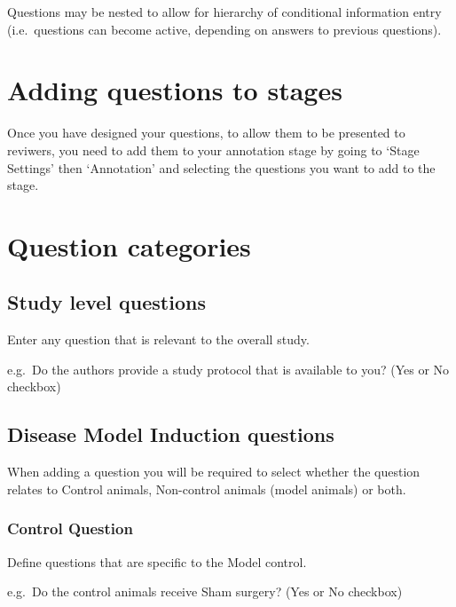 \documentclass[
]{book}
\begin{document}
Questions may be nested to allow for hierarchy of conditional information entry (i.e.~questions can become active, depending on answers to previous questions).

\hypertarget{adding-questions-to-stages}{%
\section{Adding questions to stages}\label{adding-questions-to-stages}}

Once you have designed your questions, to allow them to be presented to reviwers, you need to add them to your annotation stage by going to `Stage Settings' then `Annotation' and selecting the questions you want to add to the stage.

\hypertarget{question-categories-1}{%
\section{Question categories}\label{question-categories-1}}

\hypertarget{study-level-questions}{%
\subsection{Study level questions}\label{study-level-questions}}

Enter any question that is relevant to the overall study.

e.g.~Do the authors provide a study protocol that is available to you?
(Yes or No checkbox)

\hypertarget{disease-model-induction-questions}{%
\subsection{Disease Model Induction questions}\label{disease-model-induction-questions}}

When adding a question you will be required to select whether the question relates to Control animals, Non-control animals (model animals) or both.

\hypertarget{control-question}{%
\subsubsection{Control Question}\label{control-question}}

Define questions that are specific to the Model control.

e.g.~Do the control animals receive Sham surgery?
(Yes or No checkbox)
\end{document}
